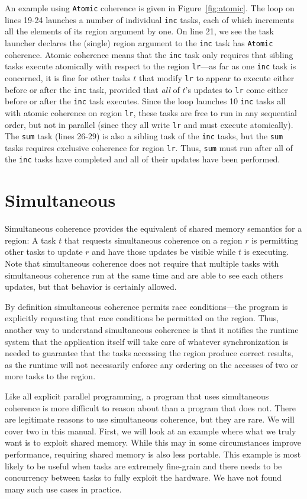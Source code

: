 An example using {\tt Atomic} coherence is given in Figure~\ref{fig:atomic}.
The loop on lines 19-24 launches a number of individual {\tt inc} tasks,
each of which increments all the elements of its region argument by one.
On line 21, we see the task launcher declares the (single) region argument
to the {\tt inc} task has {\tt Atomic} coherence.  Atomic coherence means that
the {\tt inc} task only requires that sibling tasks execute atomically with
respect to the region {\tt lr}---as far as one {\tt inc} task is concerned,
it is fine for other tasks $t$ that modify {\tt lr} to appear to execute either before or
after the {\tt inc} task, provided that {\em all} of $t$'s updates
to {\tt lr} come either before or after the {\tt inc} task executes.
Since the loop launches 10 {\tt inc} tasks all with atomic coherence on region {\tt lr},
these tasks are free to run in any sequential order, but not in parallel (since
they all write {\tt lr} and must execute atomically).  The {\tt sum} task (lines 26-29)
is also a sibling task of the {\tt inc} tasks, but the {\tt sum} tasks requires
exclusive coherence for region {\tt lr}.  Thus, {\tt sum} must run after all of the {\tt inc} tasks have completed and all of their updates have been performed.

\section{Simultaneous}
\label{sec:simultaneous}

Simultaneous coherence provides the equivalent of shared memory semantics for a region: A task $t$ that requests simultaneous coherence on a region $r$ is permitting
other tasks to update $r$ and have those updates be visible while $t$ is executing.  Note that simultaneous coherence does not require that multiple tasks with simultaneous coherence run at the same time and are able to see each others updates, but that behavior is certainly allowed.

By definition simultaneous coherence permits race conditions---the program is 
explicitly requesting that race conditions be permitted on the region. Thus, another way to understand simultaneous coherence is that it notifies the runtime system
that the application itself will take care of whatever synchronization is needed to guarantee that the tasks accessing the region
produce correct results, as the runtime will not necessarily enforce any ordering on the accesses of two or more tasks to the region.

Like all explicit parallel programming, a program that uses simultaneous coherence is more difficult to reason about than a program that does not.  There are legitimate reasons to use simultaneous
coherence, but they are rare.  We will cover two in this manual.  First, we will look at an example where what we truly want is to exploit shared memory.  While this may
in some circumstances improve performance, requiring shared memory is also less portable.  This example is most likely to be useful when tasks are extremely fine-grain
and there needs to be concurrency between tasks to fully exploit the hardware. We have not found many such use cases in practice.

